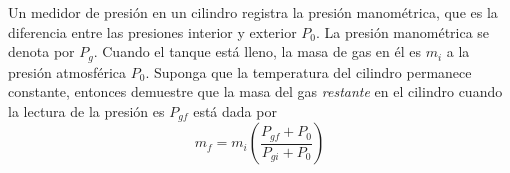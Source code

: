 \item Un medidor de presión en un cilindro registra la presión manométrica, que es la diferencia entre las presiones interior y exterior $P_0$. La presión manométrica se denota por $P_g$. Cuando el tanque está lleno, la masa de gas en él es $m_i$ a la presión atmosférica $P_0$. Suponga que la temperatura del cilindro permanece constante, entonces demuestre que la masa del gas \textit{restante} en el cilindro cuando la lectura de la presión es $P_{gf}$ está dada por
$$m_f = m_i \left( \frac{P_{gf} + P_0}{P_{gi} + P_0} \right)$$
